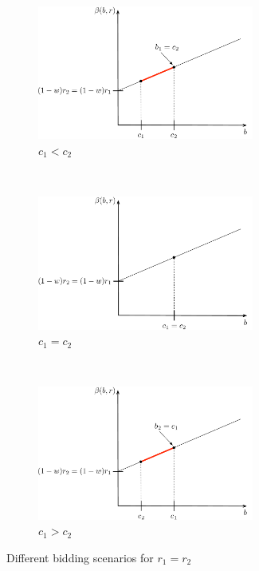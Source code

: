 \begin{figure}[p!]
	\vspace{0.5cm}
	\begin{subfigure}[b]{0.5\textwidth}
		\includegraphics[width=2.8in]{Direct/Figures/complete_N_2_c4}	  
	  \caption{$c_1<c_2$}
	  \label{fig:complete_N_2_c4_direct}
	\end{subfigure}
	\vspace{0.5cm}\\
	\begin{subfigure}[b]{0.5\textwidth}
	  \includegraphics[width=2.8in]{Direct/Figures/complete_N_2_c5}
	  \caption{$c_1=c_2$}
	  \label{fig:complete_N_2_c5_direct}
	\end{subfigure}
	\vspace{0.5cm}\\
	\begin{subfigure}[b]{0.5\textwidth}
	  \includegraphics[width=2.8in]{Direct/Figures/complete_N_2_c6}
	  \caption{$c_1 > c_2$}
	  \label{fig:complete_N_2_c6_direct}
	\end{subfigure}
	\caption{Different bidding scenarios for $r_1 = r_2$}
	\label{fig:complete_N_2_2_direct}
\end{figure}

